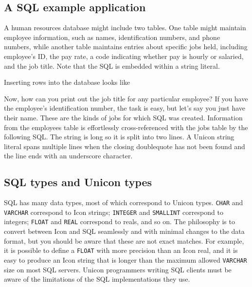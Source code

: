 \subsection{A SQL example application}

A human resources database might include two tables. One
table might maintain employee information, such as names,
identification numbers, and phone numbers, while another table
maintains entries about specific jobs held, including
employee's ID, the pay rate, a code indicating whether
pay is hourly or salaried, and the job title. Note that the SQL is
embedded within a string literal.


\noindent
Inserting rows into the database looks like


Now, how can you print out the job title for any particular employee? If
you have the employee's identification number, the
task is easy, but let's say you just have their name.
These are the kinds of jobs for which SQL was created. Information from
the employees table is effortlessly cross-referenced with the jobs
table by the following SQL. The string is long so it is split into
two lines. A Unicon string literal spans multiple lines when the
closing doublequote has not been found and the line ends with an
underscore character.


\subsection{SQL types and Unicon types}

SQL has many data types, most of which correspond to Unicon types.
\texttt{CHAR} and \texttt{VARCHAR} correspond to Icon
strings; \texttt{INTEGER} and \texttt{SMALLINT} correspond to integers;
\texttt{FLOAT} and \texttt{REAL} correspond to reals, and so on. The
philosophy is to convert between Icon and SQL seamlessly and with
minimal changes to the data format, but you should be aware that these
are not exact matches. For example, it is possible to define a
\texttt{FLOAT} with more precision than an Icon real, and it is easy to
produce an Icon string that is longer than the maximum allowed
\texttt{VARCHAR} size on most SQL servers. Unicon programmers writing
SQL clients must be aware of the limitations of the SQL implementations
they use.

